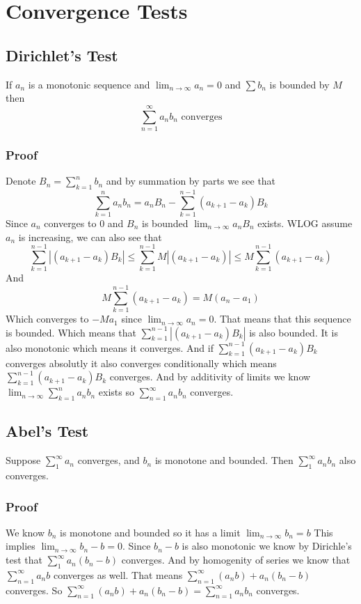 \documentclass{article}
\begin{document}
	\newpage
	
	\section{Convergence Tests}
	\subsection{Dirichlet's Test}
	If $a_n$ is a monotonic sequence and $\lim_{n\to\infty}{a_n}=0$ and 
	$\sum b_n$ is bounded by $M$ then
	\[
		\sum_{n=1}^\infty a_nb_n \text{ converges}
	\]
	\subsubsection{Proof}
		Denote $B_{n} = \sum_{k=1}^{n}{b_{n}}$ and by summation by parts we see that
		\[
			\sum_{k=1}^{n}{a_{n}b_{n}} = a_{n}B_{n} - \sum_{k=1}^{n-1}{(a_{k+1}-a_{k})B_k}
		\]
		Since $a_{n}$ converges to $0$ and $B_{n}$ is bounded 
		$\lim_{n\to\infty}{a_nB_n}$ exists.
		WLOG assume $a_n$ is increasing, we can also see that
		\[
			\sum_{k=1}^{n-1}{|(a_{k+1}-a_{k})B_k|} \le
		    \sum_{k=1}^{n-1}{M|(a_{k+1}-a_{k})|} \le
			M \sum_{k=1}^{n-1}{(a_{k+1}-a_{k})}
		\] 
		And
		\[
			M \sum_{k=1}^{n-1}{(a_{k+1}-a_{k})} = M(a_{n}-a_{1})
		\]
		Which converges to $-Ma_1$ since $\lim_{n\to\infty}{a_n}=0$.
		That means that this sequence is bounded. Which means that
		$\sum_{k=1}^{n-1}{|(a_{k+1}-a_{k})B_k|}$ is also bounded.
		It is also monotonic which means it converges. And if
		$\sum_{k=1}^{n-1}{(a_{k+1}-a_{k})B_k}$ converges absolutly it also
		converges conditionally which means $\sum_{k=1}^{n-1}{(a_{k+1}-a_{k})B_k}$
		converges. And by additivity of limits we know 
		$\lim_{n\to\infty}\sum_{k=1}^{n}{a_{n}b_{n}}$ exists so 
		$\sum_{n=1}^\infty a_nb_n$ converges.
	
	\newpage
	
	\subsection{Abel's Test}
	Suppose $\sum_{1}^{\infty}{a_n}$ converges, and $b_n$ is monotone and bounded.
    Then $\sum_{1}^{\infty}{a_nb_n}$ also converges.
	\subsubsection{Proof}
		We know $b_n$ is monotone and bounded so it has a limit $\lim_{n\to\infty}{b_n}=b$
		This implies $\lim_{n\to\infty}{b_n-b}=0$. 
		Since $b_n-b$ is also monotonic we know by Dirichle's test that 
		$\sum_{1}^{\infty}{a_n(b_n-b)}$ converges. And by homogenity of series we know that
		 $\sum_{n=1}^{\infty}{a_n b}$ converges as well.
		That means $\sum_{n=1}^{\infty}{(a_n b)+a_n(b_n-b)}$ converges.
		So $\sum_{n=1}^{\infty}{(a_n b)+a_n(b_n-b)} = 
		    \sum_{n=1}^{\infty}{a_nb_n}$ converges.
		
\end{document}
